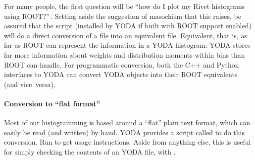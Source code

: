 For many people, the first question will be ``how do I plot my Rivet histograms
using ROOT?''\,\cite{Antcheva:2009zz}. Setting aside the suggestion of masochism
that this raises, be assured that the  script (installed by YODA
if built with ROOT support enabled) will do a direct conversion of a 
file into an equivalent  file. Equivalent, that is, as far as ROOT
can represent the information in a YODA histogram: YODA stores far more
information about weights and distribution moments within bins than ROOT can
handle. For programmatic conversion, both the C++ and Python interfaces to YODA
can convert YODA objects into their ROOT equivalents (and vice~versa).


\paragraph{Conversion to ``flat format''}

Most of our histogramming is based around a ``flat'' plain text format,
which can easily be read (and written) by hand. YODA provides a script called
 to do this conversion. Run  to get usage
instructions. Aside from anything else, this is useful for simply
checking the contents of an YODA file, with .

\vspace{1.8em}

